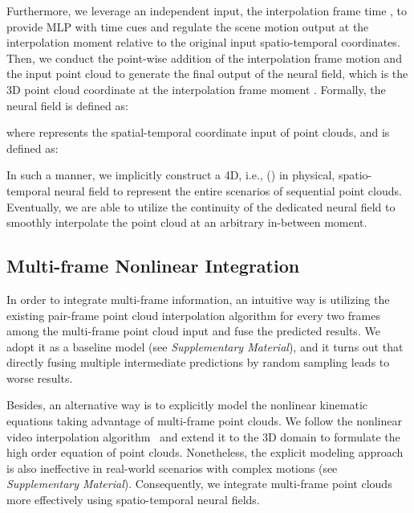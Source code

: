 \documentclass[10pt,twocolumn,letterpaper]{article}
\begin{document}
Furthermore, we leverage an independent input, the interpolation frame time , to provide MLP with time cues and regulate the scene motion output at the interpolation moment relative to the original input spatio-temporal coordinates. Then, we conduct the point-wise addition of the interpolation frame motion and the input point cloud to generate the final output of the neural field, which is the 3D point cloud coordinate at the interpolation frame moment . Formally, the neural field  is defined as:
\vspace{-.4cm}







\noindent where  represents the spatial-temporal coordinate input of point clouds, and  is defined as:




In such a manner, we implicitly construct a 4D, i.e., () in physical, spatio-temporal neural field to represent the entire scenarios of sequential point clouds. Eventually, we are able to utilize the continuity of the dedicated neural field to smoothly interpolate the point cloud at an arbitrary in-between moment.

    
    
\subsection{Multi-frame Nonlinear Integration}
\label{sec: multi-frame nonlinear integration}


In order to integrate multi-frame information, an intuitive way is utilizing the existing pair-frame point cloud interpolation algorithm for every two frames among the multi-frame point cloud input and fuse the predicted results. We adopt it as a baseline model (see \textit{Supplementary Material}), and it turns out that directly fusing multiple intermediate predictions by random sampling leads to worse results. 

Besides, an alternative way is to explicitly model the nonlinear kinematic equations taking advantage of multi-frame point clouds. We follow the nonlinear video interpolation algorithm~\cite{xu2019quadratic} and extend it to the 3D domain to formulate the high order equation of point clouds. Nonetheless, the explicit modeling approach is also ineffective in real-world scenarios with complex motions (see \textit{Supplementary Material}). Consequently, we integrate multi-frame point clouds more effectively using spatio-temporal neural fields.
\end{document}
